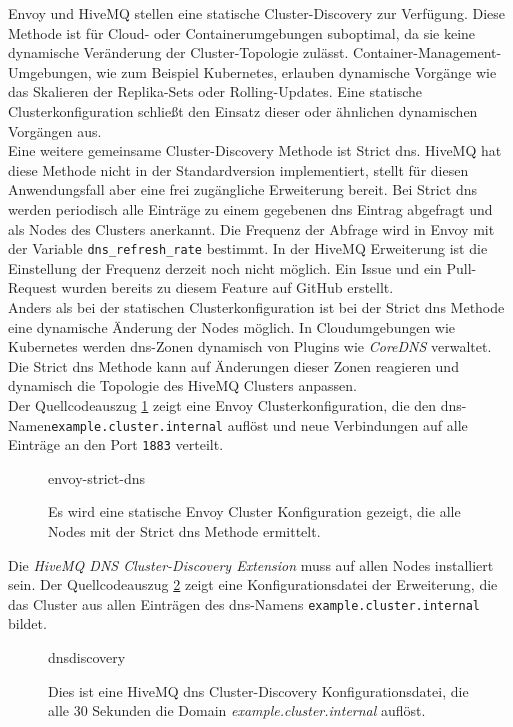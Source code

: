 Envoy und HiveMQ stellen eine statische Cluster-Discovery zur Verfügung. Diese Methode ist für Cloud- oder Containerumgebungen suboptimal, da sie keine dynamische Veränderung der Cluster-Topologie zulässt. Container-Management-Umgebungen, wie zum Beispiel Kubernetes, erlauben dynamische Vorgänge wie das Skalieren der Replika-Sets oder Rolling-Updates. Eine statische Clusterkonfiguration schlie{\ss}t den Einsatz dieser oder ähnlichen dynamischen Vorgängen aus.\\
Eine weitere gemeinsame Cluster-Discovery Methode ist Strict \ac{dns}. HiveMQ hat diese Methode nicht in der Standardversion implementiert, stellt für diesen Anwendungsfall aber eine frei zugängliche Erweiterung bereit.
Bei Strict \ac{dns} werden periodisch alle Einträge zu einem gegebenen \ac{dns} Eintrag abgefragt und als Nodes des Clusters anerkannt. Die Frequenz der Abfrage wird in Envoy mit der Variable \verb|dns_refresh_rate| bestimmt. In der HiveMQ Erweiterung ist die Einstellung der Frequenz derzeit noch nicht möglich. Ein Issue \cite{AllowConfigurationDiscovery} und ein Pull-Request \cite{ExponentialBackoffGeneral} wurden bereits zu diesem Feature auf GitHub erstellt.
\\
Anders als bei der statischen Clusterkonfiguration ist bei der Strict \ac{dns} Methode eine dynamische Änderung der Nodes möglich. In Cloudumgebungen wie Kubernetes werden \ac{dns}-Zonen dynamisch von Plugins wie \textit{CoreDNS} verwaltet.\cite{DNSServicesPods}
Die Strict \ac{dns} Methode kann auf Änderungen dieser Zonen reagieren und dynamisch die Topologie des HiveMQ Clusters anpassen.
\\
Der Quellcodeauszug \ref{code:envoy-strict-dns} zeigt eine Envoy Clusterkonfiguration, die den \ac{dns}-Namen\newline \verb|example.cluster.internal| auflöst und neue Verbindungen auf alle Einträge an den Port \verb|1883| verteilt.
\begin{figure}
    {envoy-strict-dns}
    \caption{Es wird eine statische Envoy Cluster Konfiguration gezeigt, die alle Nodes mit der Strict \ac{dns} Methode ermittelt.}
    \label{code:envoy-strict-dns}
\end{figure}
Die \textit{HiveMQ DNS Cluster-Discovery Extension} \cite{HiveMQExtensionDNS} muss auf allen Nodes installiert sein. Der Quellcodeauszug \ref{code:hivemq-dnsdiscovery} zeigt eine Konfigurationsdatei der Erweiterung, die das Cluster aus allen Einträgen des \ac{dns}-Namens \verb|example.cluster.internal| bildet.
\begin{figure}
    {dnsdiscovery}
    \caption{Dies ist eine HiveMQ \ac{dns} Cluster-Discovery Konfigurationsdatei, die alle 30 Sekunden die Domain \textit{example.cluster.internal} auflöst.}
    \label{code:hivemq-dnsdiscovery}
\end{figure}

